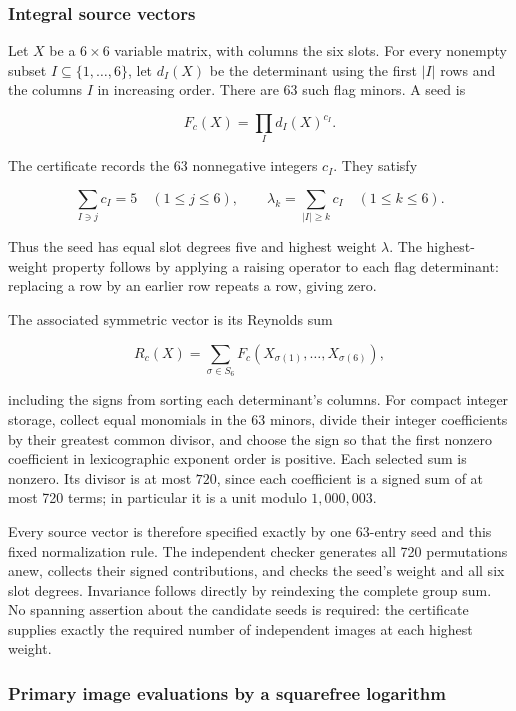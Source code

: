 \documentclass[
  10pt,
]{article}
\begin{document}
\subsubsection{Integral source vectors}\label{integral-source-vectors}

Let \(X\) be a \(6\times6\) variable matrix, with columns the six slots.
For every nonempty subset \(I\subseteq\{1,\ldots,6\}\), let \(d_I(X)\)
be the determinant using the first \(|I|\) rows and the columns \(I\) in
increasing order. There are 63 such flag minors. A seed is

\[
 F_c(X)=\prod_I d_I(X)^{c_I}.
\]

The certificate records the 63 nonnegative integers \(c_I\). They
satisfy

\[
 \sum_{I\ni j}c_I=5\quad(1\le j\le6),\qquad
 \lambda_k=\sum_{|I|\ge k}c_I\quad(1\le k\le6).
\]

Thus the seed has equal slot degrees five and highest weight
\(\lambda\). The highest-weight property follows by applying a raising
operator to each flag determinant: replacing a row by an earlier row
repeats a row, giving zero.

The associated symmetric vector is its Reynolds sum

\[
 R_c(X)=\sum_{\sigma\in S_6}F_c(X_{\sigma(1)},\ldots,X_{\sigma(6)}),
\]

including the signs from sorting each determinant's columns. For compact
integer storage, collect equal monomials in the 63 minors, divide their
integer coefficients by their greatest common divisor, and choose the
sign so that the first nonzero coefficient in lexicographic exponent
order is positive. Each selected sum is nonzero. Its divisor is at most
\(720\), since each coefficient is a signed sum of at most 720 terms; in
particular it is a unit modulo \(1,000,003\).

Every source vector is therefore specified exactly by one 63-entry seed
and this fixed normalization rule. The independent checker generates all
720 permutations anew, collects their signed contributions, and checks
the seed's weight and all six slot degrees. Invariance follows directly
by reindexing the complete group sum. No spanning assertion about the
candidate seeds is required: the certificate supplies exactly the
required number of independent images at each highest weight.

\subsubsection{Primary image evaluations by a squarefree
logarithm}\label{primary-image-evaluations-by-a-squarefree-logarithm}
\end{document}
